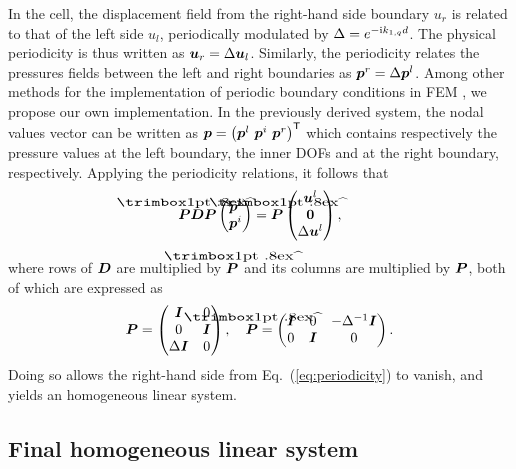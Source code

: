 In the cell, the displacement field from the right-hand side boundary $u_r$ is related to that of the left side $u_l$, periodically modulated by $\Delta = e^{-\mathrm i k_{1,q} d}$. The physical periodicity is thus written as $\boldsymbol u_r = \Delta \boldsymbol u_l$. Similarly, the periodicity relates the pressures fields between the left and right boundaries as $\boldsymbol p^r = \Delta \boldsymbol p^l$. Among other methods for the implementation of periodic boundary conditions in FEM \cite{langlet1995, mace2005}, we propose our own implementation. In the previously derived system, the nodal values vector can be written as $\boldsymbol p= \left(\boldsymbol p^l \,\,  \boldsymbol p^i \,\,  \boldsymbol p^r \right)^\mathsf T$ which contains respectively the pressure values at the left boundary, the inner DOFs and at the right boundary, respectively. Applying the periodicity relations, it follows that 
\begin{equation}
    \mbf{\hat P}\mbf D \mbf P\begin{pmatrix}
        \mbf p^l \\ \mbf p^i
    \end{pmatrix} = \mbf{\hat P}\begin{pmatrix}
        \mbf u^l \\ \mbf 0 \\  \Delta \mbf u^l
    \end{pmatrix},
    \label{eq:periodicity}
\end{equation}
where rows of $\boldsymbol D$ are multiplied by $\mbf{\hat P}$ and its columns are multiplied by $\boldsymbol P$, both of which are expressed as
\begin{equation}
    \mbf P = \begin{pmatrix} \mbf I & 0 \\ 0 & \mbf I \\ \Delta \mbf I & 0 \end{pmatrix},\quad 
    \mbf{\hat P} = 
        \begin{pmatrix}
            \mbf I & 0 & -\Delta^{-1} \mbf I \\ 0 & \mbf I & 0 
        \end{pmatrix}.
\end{equation}
Doing so allows the right-hand side from Eq.~(\ref{eq:periodicity}) to vanish, and yields an homogeneous linear system.


\subsection{\label{coupling-models} Final homogeneous linear system}

